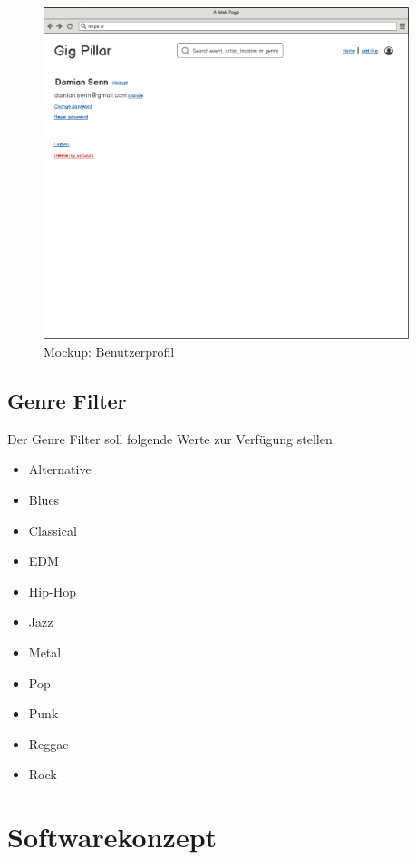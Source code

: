 \begin{figure}[!htb]
  \centering
  \includegraphics[width=0.95\textwidth]{mockups/profile.png}
  \caption{Mockup: Benutzerprofil}
\end{figure}

\clearpage
\subsection{Genre Filter}\label{genrefilter}

Der Genre Filter soll folgende Werte zur Verfügung stellen.

\begin{itemize}
  \item{} Alternative
  \item{} Blues
  \item{} Classical
  \item{} EDM
  \item{} Hip-Hop
  \item{} Jazz
  \item{} Metal
  \item{} Pop
  \item{} Punk
  \item{} Reggae
  \item{} Rock
\end{itemize}

\clearpage
\section{Softwarekonzept}\label{softwarekonzept}
